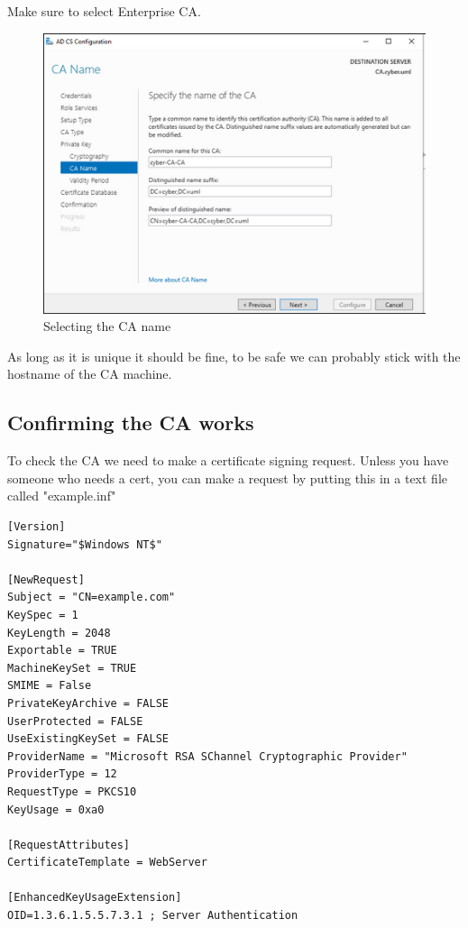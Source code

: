 \documentclass{article}
\begin{document}
Make sure to select Enterprise CA.

\begin{figure}[H]
        \centering
        \includegraphics[width=1\textwidth]{CAName.png}
        \caption{Selecting the CA name}
        \label{fig:CAName}
\end{figure}

As long as it is unique it should be fine, to be safe we can probably stick with the hostname of the CA machine.

\subsection{Confirming the CA works}

To check the CA we need to make a certificate signing request. 
Unless you have someone who needs a cert, you can make a request by putting this in a text file called "example.inf"

\begin{lstlisting}[breaklines=true, columns=fullflexible]
[Version]
Signature="$Windows NT$"

[NewRequest]
Subject = "CN=example.com"
KeySpec = 1
KeyLength = 2048
Exportable = TRUE
MachineKeySet = TRUE
SMIME = False
PrivateKeyArchive = FALSE
UserProtected = FALSE
UseExistingKeySet = FALSE
ProviderName = "Microsoft RSA SChannel Cryptographic Provider"
ProviderType = 12
RequestType = PKCS10
KeyUsage = 0xa0

[RequestAttributes]
CertificateTemplate = WebServer

[EnhancedKeyUsageExtension]
OID=1.3.6.1.5.5.7.3.1 ; Server Authentication
\end{lstlisting}
\end{document}
